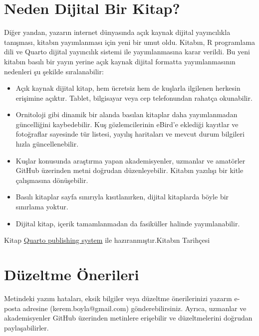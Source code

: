 \documentclass[
  letterpaper,
  DIV=11,
  numbers=noendperiod]{scrreprt}
\begin{document}
\section*{Neden Dijital Bir Kitap?}\label{neden-dijital-bir-kitap}


Diğer yandan, yazarın internet dünyasında açık kaynak dijital
yayıncılıkla tanışması, kitabın yayımlanması için yeni bir umut oldu.
Kitabın, R programlama dili ve Quarto dijital yayıncılık sistemi ile
yayımlanmasına karar verildi. Bu yeni kitabın basılı bir yayın yerine
açık kaynak dijital formatta yayımlanmasının nedenleri şu şekilde
sıralanabilir:

\begin{itemize}
\item
  Açık kaynak dijital kitap, hem ücretsiz hem de kuşlarla ilgilenen
  herkesin erişimine açıktır. Tablet, bilgisayar veya cep telefonundan
  rahatça okunabilir.
\item
  Ornitoloji gibi dinamik bir alanda basılan kitaplar daha yayımlanmadan
  güncelliğini kaybedebilir. Kuş gözlemcilerinin eBird'e eklediği
  kayıtlar ve fotoğraflar sayesinde tür listesi, yayılış haritaları ve
  mevcut durum bilgileri hızla güncellenebilir.
\item
  Kuşlar konusunda araştırma yapan akademisyenler, uzmanlar ve amatörler
  GitHub üzerinden metni doğrudan düzenleyebilir. Kitabın yazılışı bir
  kitle çalışmasına dönüşebilir.
\item
  Basılı kitaplar sayfa sınırıyla kısıtlanırken, dijital kitaplarda
  böyle bir sınırlama yoktur.
\item
  Dijital kitap, içerik tamamlanmadan da fasiküller halinde
  yayımlanabilir.
\end{itemize}

Kitap \href{https://quarto.org/}{Quarto publishing system} ile
hazıranmıştır.Kitabın Tarihçesi

\section*{Düzeltme Önerileri}\label{duxfczeltme-uxf6nerileri}


Metindeki yazım hataları, eksik bilgiler veya düzeltme önerilerinizi
yazarın e-posta adresine (kerem.boyla@gmail.com) gönderebilirsiniz.
Ayrıca, uzmanlar ve akademisyenler GitHub üzerinden metinlere erişebilir
ve düzeltmelerini doğrudan paylaşabilirler.
\end{document}
